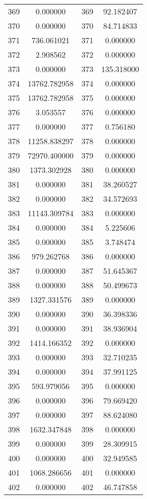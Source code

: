 \documentclass[12pt]{article}
\begin{document}
\begin{longtable}{@{}cccc@{}}
369 & 0.000000 & 369 & 92.182407 \\
370 & 0.000000 & 370 & 84.714833 \\
371 & 736.061021 & 371 & 0.000000 \\
372 & 2.908562 & 372 & 0.000000 \\
373 & 0.000000 & 373 & 135.318000 \\
374 & 13762.782958 & 374 & 0.000000 \\
375 & 13762.782958 & 375 & 0.000000 \\
376 & 3.053557 & 376 & 0.000000 \\
377 & 0.000000 & 377 & 0.756180 \\
378 & 11258.838297 & 378 & 0.000000 \\
379 & 72970.400000 & 379 & 0.000000 \\
380 & 1373.302928 & 380 & 0.000000 \\
381 & 0.000000 & 381 & 38.260527 \\
382 & 0.000000 & 382 & 34.572693 \\
383 & 11143.309784 & 383 & 0.000000 \\
384 & 0.000000 & 384 & 5.225606 \\
385 & 0.000000 & 385 & 3.748474 \\
386 & 979.262768 & 386 & 0.000000 \\
387 & 0.000000 & 387 & 51.645367 \\
388 & 0.000000 & 388 & 50.499673 \\
389 & 1327.331576 & 389 & 0.000000 \\
390 & 0.000000 & 390 & 36.398336 \\
391 & 0.000000 & 391 & 38.936904 \\
392 & 1414.166352 & 392 & 0.000000 \\
393 & 0.000000 & 393 & 32.710235 \\
394 & 0.000000 & 394 & 37.991125 \\
395 & 593.979056 & 395 & 0.000000 \\
396 & 0.000000 & 396 & 79.669420 \\
397 & 0.000000 & 397 & 88.624080 \\
398 & 1632.347848 & 398 & 0.000000 \\
399 & 0.000000 & 399 & 28.309915 \\
400 & 0.000000 & 400 & 32.949585 \\
401 & 1068.286656 & 401 & 0.000000 \\
402 & 0.000000 & 402 & 46.747858 \\

\end{longtable}
\end{document}
